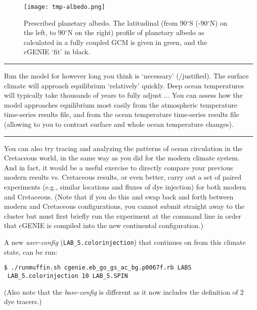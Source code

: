 \documentclass[11pt,fleqn]{book} %
\begin{document}
\begin{figure}
\texttt{[image: tmp-albedo.png]}\centering
\vspace{-6mm}
\caption{Prescribed planetary albedo.
The latitudinal (from 90$^{\circ}$S (-90$^{\circ}$N) on the left, to 90$^{\circ}$N on the right) profile of planetary albedo as calculated in a fully coupled GCM is given in green, and the cGENIE ‘fit’ in black.}
\label{fig:tmp-albedo}
\end{figure}

\vspace{1mm}
\noindent\rule{4cm}{0.1mm}
\vspace{2mm}

\noindent Run the model for however long you think is ‘necessary’ (/justified). The surface climate will approach equilibrium ‘relatively’ quickly. Deep ocean temperatures will typically take thousands of years to fully adjust ... You can assess how the model approaches equilibrium most easily from the atmospheric temperature time-series results file, and from the ocean temperature time-series results file (allowing to you to contrast surface and whole ocean temperature changes).

\vspace{1mm}
\noindent\rule{4cm}{0.1mm}
\vspace{2mm}

\noindent You can also try tracing and analyzing the patterns of ocean circulation in the Cretaceous world, in the same way as you did for the modern climate system. And in fact, it would be a useful exercise to directly compare your previous modern results vs. Cretaceous results, or even better, carry out a set of paired experiments (e.g., similar locations and fluxes of dye injection) for both modern and Cretaceous. (Note that if you do this and swap back and forth between modern and Cretaceous configurations, you cannot submit straight away to the cluster but must first briefly run the experiment at the command line in order that cGENIE is compiled into the new continental configuration.)

A new \textit{user-config} (\texttt{LAB\_5.colorinjection}) that continues on from this climate state, can be run:
\begin{verbatim}
$ ./runmuffin.sh cgenie.eb_go_gs_ac_bg.p0067f.rb LABS
 LAB_5.colorinjection 10 LAB_5.SPIN
\end{verbatim}
(Also note that the \textit{base-config} is different as it now includes the definition of 2 dye tracers.)
\end{document}
